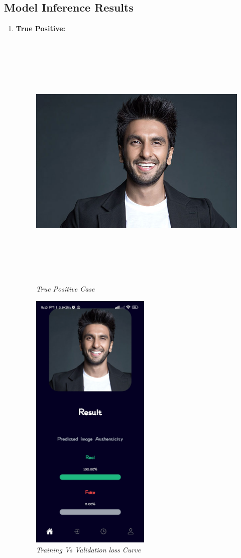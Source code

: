 \subsection{Model Inference Results }
\begin{enumerate}
    \item \textbf{True Positive:}
          \begin{figure}[ht]
              \centering
              \includegraphics[width= 5in, height =5in ]{img/ranveer.jpg}
              \caption{\textit{True Positive Case}}
          \end{figure}
          \begin{figure}[ht]
              \centering
              \includegraphics[height =5in  ]{img/ranveerResult.jpg}
              \caption{\textit{Training Vs Validation loss Curve}}
          \end{figure}


\end{enumerate}
